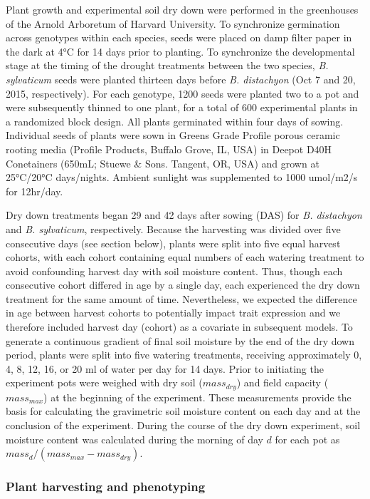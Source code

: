\documentclass[jou,floatsintext]{apa6}
\begin{document}
Plant growth and experimental soil dry down were performed in the greenhouses of the Arnold Arboretum of Harvard University. To synchronize germination across genotypes within each species, seeds were placed on damp filter paper in the dark at 4°C for 14 days prior to planting. To synchronize the developmental stage at the timing of the drought treatments between the two species, \emph{B. sylvaticum} seeds were planted thirteen days before \emph{B. distachyon} (Oct 7 and 20, 2015, respectively). For each genotype, 1200 seeds were planted two to a pot and were subsequently thinned to one plant, for a total of 600 experimental plants in a randomized block design. All plants germinated within four days of sowing. Individual seeds of plants were sown in Greens Grade Profile porous ceramic rooting media (Profile Products, Buffalo Grove, IL, USA) in Deepot D40H Conetainers (650mL; Stuewe \& Sons. Tangent, OR, USA) and grown at 25°C/20°C days/nights. Ambient sunlight was supplemented to 1000 umol/m2/s for 12hr/day.

Dry down treatments began 29 and 42 days after sowing (DAS) for \emph{B. distachyon} and \emph{B. sylvaticum}, respectively. Because the harvesting was divided over five consecutive days (see section below), plants were split into five equal harvest cohorts, with each cohort containing equal numbers of each watering treatment to avoid confounding harvest day with soil moisture content. Thus, though each consecutive cohort differed in age by a single day, each experienced the dry down treatment for the same amount of time. Nevertheless, we expected the difference in age between harvest cohorts to potentially impact trait expression and we therefore included harvest day (cohort) as a covariate in subsequent models. To generate a continuous gradient of final soil moisture by the end of the dry down period, plants were split into five watering treatments, receiving approximately 0, 4, 8, 12, 16, or 20 ml of water per day for 14 days. Prior to initiating the experiment pots were weighed with dry soil (\(mass_{dry}\)) and field capacity (\(mass_{max}\)) at the beginning of the experiment. These measurements provide the basis for calculating the gravimetric soil moisture content on each day and at the conclusion of the experiment. During the course of the dry down experiment, soil moisture content was calculated during the morning of day \(d\) for each pot as \(mass_d/(mass_{max}-mass_{dry})\).

\hypertarget{plant-harvesting-and-phenotyping}{%
\subsubsection{Plant harvesting and phenotyping}\label{plant-harvesting-and-phenotyping}}
\end{document}
